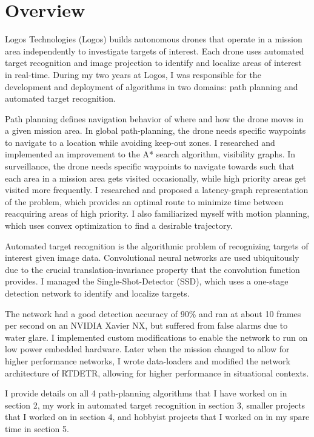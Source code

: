 \section{Overview}
Logos Technologies (Logos) builds autonomous drones that operate in a mission area independently to investigate targets of interest.
Each drone uses automated target recognition and image projection to identify and localize areas of interest in real-time.
During my two years at Logos, I was responsible for the development and deployment of algorithms in two domains: path planning and automated target recognition.

Path planning defines navigation behavior of where and how the drone moves in a given mission area.
In global path-planning, the drone needs specific waypoints to navigate to a location while avoiding keep-out zones.
I researched and implemented an improvement to the A* search algorithm, visibility graphs.
In surveillance, the drone needs specific waypoints to navigate towards such that each area in a mission area gets visited occasionally, while high priority areas get visited more frequently.
I researched and proposed a latency-graph representation of the problem, which provides an optimal route to minimize time between reacquiring areas of high priority.
I also familiarized myself with motion planning, which uses convex optimization to find a desirable trajectory.

Automated target recognition is the algorithmic problem of recognizing targets of interest given image data.
Convolutional neural networks are used ubiquitously due to the crucial translation-invariance property that the convolution function provides.
I managed the Single-Shot-Detector (SSD), which uses a one-stage detection network to identify and localize targets.

The network had a good detection accuracy of 90\% and ran at about 10 frames per second on an NVIDIA Xavier NX, but suffered from false alarms due to water glare.
I implemented custom modifications to enable the network to run on low power embedded hardware.
Later when the mission changed to allow for higher performance networks, I wrote data-loaders and modified the network architecture of RTDETR, allowing for higher performance in situational contexts.

I provide details on all 4 path-planning algorithms that I have worked on in section 2, my work in automated target recognition in section 3, smaller projects that I worked on in section 4, and hobbyist projects that I worked on in my spare time in section 5.